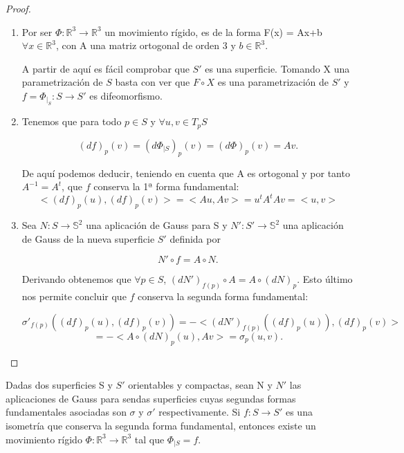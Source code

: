 \begin{proof}
	${ }$%
	\begin{enumerate}
		\item Por ser $ \Phi : \mathbb{R}^3 \to \mathbb{R}^3 $ un movimiento rígido, es de la forma F(x) = Ax+b $\forall x \in \mathbb{R}^3$, con A una matriz ortogonal de orden 3 y $b \in \mathbb{R}^3$.
		
		A partir de aquí es fácil comprobar que $S'$ es una superficie. Tomando X una parametrización de $S$ basta con ver que $F\circ X$ es una parametrización de $S'$ y $f = \Phi_{\mid_{S}} : S \to S'$ es difeomorfismo.
		
		
		\item Tenemos que para todo $p \in S$ y $\forall u, v \in T_p S$
		
		\[
		(df)_p(v) = (d\Phi_{\mid S})_p(v) = (d\Phi)_p(v) = Av.
		\]
		
		De aquí podemos deducir, teniendo en cuenta que A es ortogonal y por tanto $A^{-1} = A^t$, que $f$ conserva la 1ª forma fundamental:
		\[
		<(df)_p(u), (df)_p(v)> = <Au, Av> = u^tA^tAv = <u, v>
		\]
		
		\item Sea $N : S \to \mathbb{S}^2$ una aplicación de Gauss para S y $N' : S' \to \mathbb{S}^2$ una aplicación de Gauss de la nueva superficie $S'$ definida por
		
		\[
		N'\circ f = A\circ N.
		\]
		
		Derivando obtenemos que $\forall p \in S$,  $(dN')_{f(p)}\circ A = A \circ (dN)_p$. Esto último nos permite concluir que $f$ conserva la segunda forma fundamental:
		
		\[
		\sigma'_{f(p)}((df)_p(u), (df)_p(v)) = -<(dN')_{f(p)}((df)_p(u)), (df)_p(v)>
		\]
		\[
		= -<A\circ(dN)_p(u), Av> = \sigma_p(u, v).
		\]
	\end{enumerate}
\end{proof}

\begin{teorema}
	Dadas dos superficies S y $S'$ orientables y compactas, sean N y $N'$ las aplicaciones de Gauss para sendas superficies cuyas segundas formas fundamentales asociadas son $\sigma$ y $\sigma'$ respectivamente.
	Si $f : S \to S'$ es una isometría que conserva la segunda forma fundamental, entonces existe un movimiento rígido $\Phi : \mathbb{R}^3 \to \mathbb{R}^3$ tal que $\Phi_{\mid S} = f$.
\end{teorema}

